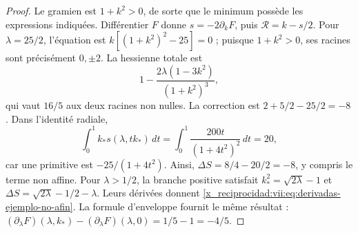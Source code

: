 \begin{proof}
Le gramien est \(1+k^2>0\), de sorte que le minimum possède les expressions indiquées. Différentier \(F\) donne \(s=-2\partial_kF\), puis \(\mathcal R=k-s/2\). Pour \(\lambda=25/2\), l'équation est \(k[(1+k^2)^2-25]=0\) ; puisque \(1+k^2>0\), ses racines sont précisément \(0,\pm2\). La hessienne totale est
\[
 1-\frac{2\lambda(1-3k^2)}{(1+k^2)^3},
\]
qui vaut \(16/5\) aux deux racines non nulles. La correction est
\(2+5/2-25/2=-8\). Dans l'identité radiale,
\[
 \int_0^1 k_*s(\lambda,tk_*)\,dt
    =\int_0^1\frac{200t}{(1+4t^2)^2}\,dt=20,
\]
car une primitive est \(-25/(1+4t^2)\).
Ainsi, \(\Delta S=8/4-20/2=-8\), y compris le terme non affine.
Pour \(\lambda>1/2\), la branche positive satisfait
\(k_*^2=\sqrt{2\lambda}-1\) et
\(\Delta S=\sqrt{2\lambda}-1/2-\lambda\).
Leurs dérivées donnent \eqref{x_reciprocidad:vii:eq:derivadas-ejemplo-no-afin}.
La formule d'enveloppe fournit le même résultat :
\((\partial_\lambda F)(\lambda,k_*)
 -(\partial_\lambda F)(\lambda,0)=1/5-1=-4/5\).
\end{proof}




